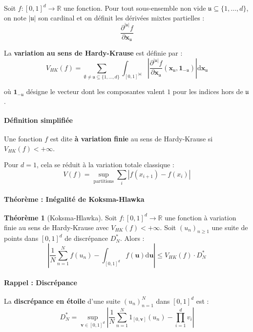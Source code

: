 \documentclass[12pt,a4paper]{article}
\theoremstyle{definition}
\newtheorem{theorem}{Théorème}[section]
\theoremstyle{remark}
\newcommand{\R}{\mathbb{R}}
\newcommand{\dd}{\mathrm{d}}
\begin{document}
Soit $f : [0,1]^d \to \R$ une fonction. Pour tout sous-ensemble non vide $\mathfrak{u} \subseteq \{1, \ldots, d\}$, on note $|\mathfrak{u}|$ son cardinal et on définit les dérivées mixtes partielles :
\[
\frac{\partial^{|\mathfrak{u}|} f}{\partial \mathbf{x}_\mathfrak{u}}
\]

La \textbf{variation au sens de Hardy-Krause} est définie par :
\[
V_{HK}(f) = \sum_{\emptyset \neq \mathfrak{u} \subseteq \{1,\ldots,d\}} \int_{[0,1]^{|\mathfrak{u}|}} \left|\frac{\partial^{|\mathfrak{u}|} f}{\partial \mathbf{x}_\mathfrak{u}}(\mathbf{x}_\mathfrak{u}, \mathbf{1}_{-\mathfrak{u}})\right| \dd \mathbf{x}_\mathfrak{u}
\]

où $\mathbf{1}_{-\mathfrak{u}}$ désigne le vecteur dont les composantes valent $1$ pour les indices hors de $\mathfrak{u}$.

\paragraph{Définition simplifiée}

Une fonction $f$ est dite \textbf{à variation finie} au sens de Hardy-Krause si $V_{HK}(f) < +\infty$.

Pour $d=1$, cela se réduit à la variation totale classique :
\[
V(f) = \sup_{\text{partitions}} \sum_{i} |f(x_{i+1}) - f(x_i)|
\]

\paragraph{Théorème : Inégalité de Koksma-Hlawka}

\begin{theorem}[Koksma-Hlawka]
Soit $f : [0,1]^d \to \R$ une fonction à variation finie au sens de Hardy-Krause avec $V_{HK}(f) < +\infty$. Soit $(u_n)_{n \geq 1}$ une suite de points dans $[0,1]^d$ de discrépance $D_N^*$. Alors :
\[
\left|\frac{1}{N}\sum_{n=1}^N f(u_n) - \int_{[0,1]^d} f(\mathbf{u})\dd \mathbf{u}\right| \leq V_{HK}(f) \cdot D_N^*
\]
\end{theorem}

\paragraph{Rappel : Discrépance}

La \textbf{discrépance en étoile} d'une suite $(u_n)_{n=1}^N$ dans $[0,1]^d$ est :
\[
D_N^* = \sup_{\mathbf{v} \in [0,1]^d} \left|\frac{1}{N}\sum_{n=1}^N 1_{[0,\mathbf{v}]}(u_n) - \prod_{i=1}^d v_i\right|
\]
\end{document}
